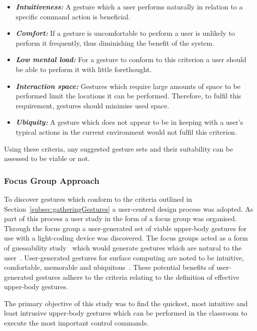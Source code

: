 \documentclass[link]{IWCOMP}
\begin{document}
\begin{itemize}
\item \textit{\textbf{Intuitiveness:}} A gesture which a user performs naturally in relation to a specific command action is beneficial.
\item \textit{\textbf{Comfort:}} If a gesture is uncomfortable to perform a user is unlikely to perform it frequently, thus diminishing the benefit of the system.
\item \textit{\textbf{Low mental load:}} For a gesture to conform to this criterion a user should be able to perform it with little forethought.
\item \textit{\textbf{Interaction space:}} Gestures which require large amounts of space to be performed limit the locations it can be performed.
Therefore, to fulfil this requirement, gestures should minimise used space.
\item \textit{\textbf{Ubiquity:}} A gesture which does not appear to be in keeping with a user's typical actions in the current environment would not fulfil this criterion. \\ 
\end{itemize}

Using these criteria, any suggested gesture sets and their suitability can be assessed to be viable or not.

\subsubsection{Focus Group Approach} 
\label{subsec:focusGroupDesign}

To discover gestures which conform to the criteria outlined in Section~\ref{subsec:gatheringGestures} a user-centred design process was adopted.
As part of this process a user study in the form of a focus group was organised.
Through the focus group a user-generated set of viable upper-body gestures for use with a light-coding device was discovered.
The focus groups acted as a form of guessability study~\cite{Ruiz2011,Wobbrock2009} which would generate gestures which are natural to the user~\cite{Grandhi2011}.
User-generated gestures for surface computing are noted to be intuitive, comfortable, memorable and ubiquitous~\cite{Bjorneseth2012}.
These potential benefits of user-generated gestures adhere to the criteria relating to the definition of effective upper-body gestures.

The primary objective of this study was to find the quickest, most intuitive and least intrusive upper-body gestures which can be performed in the classroom to execute the most important control commands.
\end{document}
